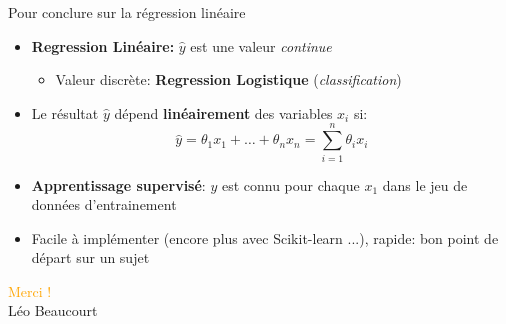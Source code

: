 \documentclass[11pt]{beamer}
\begin{document}
\begin{frame}{Pour conclure sur la régression linéaire}
  \begin{itemize}
  \item \textbf{Regression Linéaire:} $\hat{y}$ est une valeur \textit{continue}
    \begin{itemize}
    \item Valeur discrète: \textbf{Regression Logistique} (\textit{classification})
    \end{itemize}
    \vspace{0.2cm}
  \item Le résultat $\hat{y}$ dépend \textbf{linéairement} des variables $x_{i}$ si:
    \begin{equation*}
      \hat{y} = \theta_{1}x_{1} + \dots + \theta_{n}x_{n} = \displaystyle\sum_{i=1}^{n} \theta_{i} x_{i}
    \end{equation*}
  \item \textbf{Apprentissage supervisé}: $y$ est connu pour chaque $x_{1}$ dans le jeu de données d'entrainement
  \item Facile à implémenter (encore plus avec Scikit-learn ...), rapide: bon point de départ sur un sujet
  \end{itemize}
\end{frame}



\begin{frame}

  \vspace{5cm}
  \begin{center}
    \Large
    \textcolor{orange}{Merci !}\\
    \normalsize
    \vspace{0.5cm}
    Léo Beaucourt
  \end{center}

\end{frame}
\end{document}
